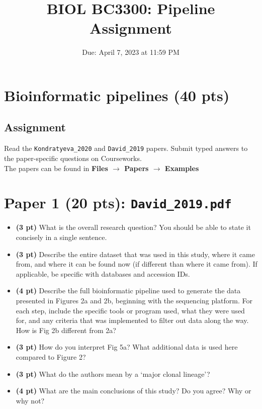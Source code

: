 \documentclass{article}
\title{BIOL BC3300: Pipeline Assignment}
\date{Due: April 7, 2023 at 11:59 PM}
\begin{document}
\maketitle

\section*{Bioinformatic pipelines (40 pts)}

\subsection*{Assignment}
Read the \texttt{Kondratyeva\_2020} and \texttt{David\_2019} papers. Submit typed answers to the paper-specific questions on Courseworks.\\

The papers can be found in \textbf{Files $\to$ Papers $\to$ Examples}

\section*{Paper 1 (20 pts): \texttt{David\_2019.pdf}}
\begin{itemize}
    \item \textbf{(3 pt)} What is the overall research question? You should be able to state it concisely in a single sentence.
    \item \textbf{(3 pt)} Describe the entire dataset that was used in this study, where it came from, and where it can be found now (if different than where it came from). If applicable, be specific with databases and accession IDs.
    \item \textbf{(4 pt)} Describe the full bioinformatic pipeline used to generate the data presented in Figures 2a and 2b, beginning with the sequencing platform. For each step, include the specific tools or program used, what they were used for, and any criteria that was implemented to filter out data along the way. How is Fig 2b different from 2a? 
    \item \textbf{(3 pt)} How do you interpret Fig 5a? What additional data is used here compared to Figure 2?
    \item \textbf{(3 pt)} What do the authors mean by a `major clonal lineage'?
    \item \textbf{(4 pt)} What are the main conclusions of this study? Do you agree? Why or why not?
\end{itemize}
\end{document}
